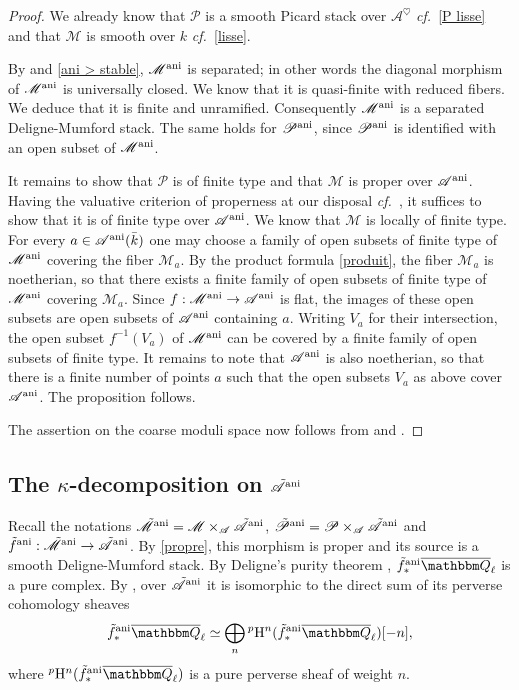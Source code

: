 \documentclass[12pt,english]{smfart}
\numberwithin{equation}{subsection}
\theoremstyle{remark}
\newcommand\calA{{\mathscr A}}
\newcommand\calP{{\mathscr P}}
\newcommand\calM{{\mathscr M}}
\newcommand\QQ{{\mathbbm Q}}
\newcommand\rmH{{\rm H}}
\newcommand\cf{{\it cf.\ }}
\newcommand\ani{{\rm ani}}
\newcommand\Ql{{\overline\QQ_\ell}}
\begin{document}
\begin{proof}
We already know that $\calP$ is a smooth Picard stack over $\calA^\heartsuit$ \cf \ref{P lisse} and that $\calM$ is smooth over $k$ \cf \ref{lisse}.

By \cite[II.4]{Fa} and \ref{ani > stable}, $\calM^\ani$ is separated; in other words the diagonal morphism of $\calM^\ani$ is universally closed. We know that it is quasi-finite with reduced fibers. We deduce that it is finite and unramified. Consequently $\calM^\ani$ is a separated Deligne-Mumford stack. The same holds for $\calP^\ani$, since $\calP^\ani$ is identified with an open subset of $\calM^\ani$.

It remains to show that $\calP$ is of finite type and that $\calM$ is proper over $\calA^\ani$. Having the valuative criterion of properness at our disposal \cf \cite[II.4]{Fa}, it suffices to show that it is of finite type over $\calA^\ani$. We know that $\calM$ is locally of finite type. For every $a\in\calA^\ani(\bar k)$ one may choose a family of open subsets of finite type of $\calM^\ani$ covering the fiber $\calM_a$. By the product formula \ref{produit}, the fiber $\calM_a$ is noetherian, so that there exists a finite family of open subsets of finite type of $\calM^\ani$ covering $\calM_a$. Since $f:\calM^\ani\rightarrow\calA^\ani$ is flat, the images of these open subsets are open subsets of $\calA^\ani$ containing $a$. Writing $V_a$ for their intersection, the open subset $f^{-1}(V_a)$ of $\calM^\ani$ can be covered by a finite family of open subsets of finite type. It remains to note that $\calA^\ani$ is also noetherian, so that there is a finite number of points $a$ such that the open subsets $V_a$ as above cover $\calA^\ani$. The proposition follows.

The assertion on the coarse moduli space now follows from \cite[II.5]{Fa} and \cite{Ray}.
\end{proof}

\subsection{The $\kappa$-decomposition on $\tilde\calA^\ani$}
\label{subsection : kappa-decomposition}

Recall the notations $\tilde\calM^\ani=\calM\times_\calA\tilde\calA^\ani$, $\tilde\calP^\ani=\calP\times_\calA\tilde\calA^\ani$ and $\tilde f^\ani:\tilde\calM^\ani\rightarrow\tilde\calA^\ani$. By \ref{propre}, this morphism is proper and its source is a smooth Deligne-Mumford stack. By Deligne's purity theorem \cite{Weil2}, $\tilde f^\ani_*\Ql$ is a pure complex. By \cite[5.4.5]{BBD}, over $\tilde\calA^\ani$ it is isomorphic to the direct sum of its perverse cohomology sheaves
$$\tilde f^\ani_*\Ql\simeq\bigoplus_n {}^p\rmH^n(\tilde f^\ani_*\Ql)[-n],$$
where ${}^p\rmH^n(\tilde f^\ani_*\Ql)$ is a pure perverse sheaf of weight $n$.
\end{document}
